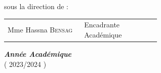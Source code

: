 \documentclass[a4paper, oneside, 12pt, final]{extreport}
\newcommand{\studyDepartment} {%
  2023/2024%
}
\newcommand{\juryMemberOne} {%
Mme Hassna  \textsc{Bensag}%
}
\newcommand{\juryMemberOneDesc} {%
  Encadrante Académique%
}
\newcommand{\juryMemberTwoDesc} {%
  Encadrant Entreprise%
}
\begin{document}
\begin{titlepage}
\begin{center}
\vspace{10pt}
sous la direction de :\\
\vspace{20pt}

\vspace{10pt}
\begin{tabular}{p{0.3\linewidth} p{0.3\linewidth}}
  \juryMemberOne{} & \juryMemberOneDesc{}\\
\end{tabular}



\vspace{30pt}%
\textbf{\textit{ Année Académique}}\\

\vspace{10pt}
(\studyDepartment)\\
\end{center}
\end{titlepage}

%
\end{document}
